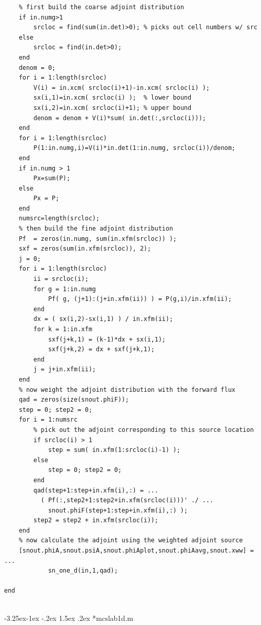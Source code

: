 \documentclass[letter,11pt]{article}
\makeatletter
\renewcommand\subsection{\@startsection{subsection}{2}{\z@}%
                                {-3.25ex\@plus -1ex \@minus -.2ex}%
                                {1.5ex \@plus .2ex}%
                                {\normalfont\itshape\bf}}
\makeatother
\begin{document}
{\begin{verbatim}
    % first build the coarse adjoint distribution
    if in.numg>1
        srcloc = find(sum(in.det)>0); % picks out cell numbers w/ src
    else
        srcloc = find(in.det>0);
    end
    denom = 0;
    for i = 1:length(srcloc)
        V(i) = in.xcm( srcloc(i)+1)-in.xcm( srcloc(i) );
        sx(i,1)=in.xcm( srcloc(i) );  % lower bound
        sx(i,2)=in.xcm( srcloc(i)+1); % upper bound
        denom = denom + V(i)*sum( in.det(:,srcloc(i)));  
    end
    for i = 1:length(srcloc)
        P(1:in.numg,i)=V(i)*in.det(1:in.numg, srcloc(i))/denom;    
    end
    if in.numg > 1
        Px=sum(P);
    else
        Px = P;
    end
    numsrc=length(srcloc);
    % then build the fine adjoint distribution
    Pf  = zeros(in.numg, sum(in.xfm(srcloc)) );
    sxf = zeros(sum(in.xfm(srcloc)), 2);
    j = 0;
    for i = 1:length(srcloc)
        ii = srcloc(i);
        for g = 1:in.numg
            Pf( g, (j+1):(j+in.xfm(ii)) ) = P(g,i)/in.xfm(ii);
        end
        dx = ( sx(i,2)-sx(i,1) ) / in.xfm(ii);
        for k = 1:in.xfm
            sxf(j+k,1) = (k-1)*dx + sx(i,1);
            sxf(j+k,2) = dx + sxf(j+k,1);
        end
        j = j+in.xfm(ii);
    end
    % now weight the adjoint distribution with the forward flux
    qad = zeros(size(snout.phiF));
    step = 0; step2 = 0;
    for i = 1:numsrc
        % pick out the adjoint corresponding to this source location
        if srcloc(i) > 1
            step = sum( in.xfm(1:srcloc(i)-1) );
        else
            step = 0; step2 = 0;
        end
        qad(step+1:step+in.xfm(i),:) = ...
          ( Pf(:,step2+1:step2+in.xfm(srcloc(i)))' ./ ...
            snout.phiF(step+1:step+in.xfm(i),:) );
        step2 = step2 + in.xfm(srcloc(i));
    end
    % now calculate the adjoint using the weighted adjoint source
    [snout.phiA,snout.psiA,snout.phiAplot,snout.phiAavg,snout.xww] = ...
            sn_one_d(in,1,qad);

end


\end{verbatim}
}

\subsection*{{\sf mcslab1d.m} }
\end{document}
